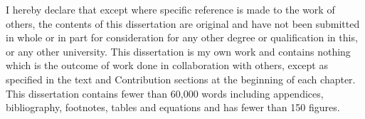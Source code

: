 
\begin{declaration}

I hereby declare that except where specific reference is made to the work of  others, the contents of this dissertation are original and have not been  submitted in whole or in part for consideration for any other degree or qualification in this, or any other university. 
This dissertation is my own work and contains nothing which is the outcome of work done in collaboration with others, except as specified in the text and Contribution sections at the beginning of each chapter. 
This dissertation contains fewer than 60,000 words including appendices, bibliography, footnotes, tables and equations and has fewer than 150 figures.


\end{declaration}